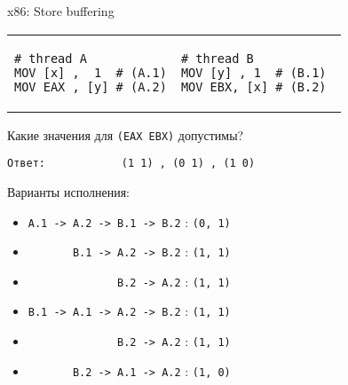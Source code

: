 \begin{frame}{x86: Store buffering}

\begin{tabular}{p{} p{}}
\begin{verbatim}
# thread A
MOV [x] ,  1  # (A.1)
MOV EAX , [y] # (A.2)
\end{verbatim}

& 

\begin{verbatim}
# thread B          
MOV [y] , 1  # (B.1) 
MOV EBX, [x] # (B.2) 
\end{verbatim}
\end{tabular}

Какие значения для \texttt{(EAX EBX)} допустимы?

\texttt{Ответ:\ \ \ \ \ \ \ \ \ \ \ \ (1 1)\ , (0 1)\ , (1 0)}

Варианты исполнения:
\begin{itemize}
    \item \texttt{A.1 -> A.2 -> B.1 -> B.2}                            : \texttt{(0, 1)}
    \item \texttt{\ \ \ \ \ \ \       B.1 -> A.2 -> B.2}               : \texttt{(1, 1)}
    \item \texttt{\ \ \ \ \ \ \ \ \ \ \ \ \ \              B.2 -> A.2} : \texttt{(1, 1)}
    \item \texttt{B.1 -> A.1 -> A.2 -> B.2}                            : \texttt{(1, 1)}
    \item \texttt{\ \ \ \ \ \ \ \ \ \ \ \ \ \              B.2 -> A.2} : \texttt{(1, 1)}
    \item \texttt{\ \ \ \ \ \ \       B.2 -> A.1 -> A.2}               : \texttt{(1, 0)}
\end{itemize}
\end{frame}

